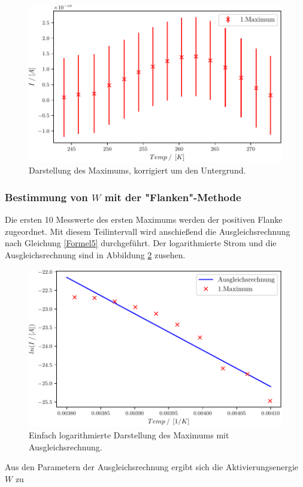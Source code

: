 \begin{figure}[H]
  \centering
  \includegraphics[width=.75\textwidth]{build/1_Temp_current_peak.pdf}
  \caption{Darstellung des Maximums, korrigiert um den Untergrund.}
  \label{fig:Auswertung_5_6}
\end{figure}


\subsubsection{Bestimmung von $W$ mit der "Flanken"-Methode}

Die ersten 10 Messwerte des ersten Maximums werden der positiven Flanke zugeordnet. Mit diesem Teilintervall wird anschießend die Ausgleichsrechnung nach Gleichung \eqref{Formel5} durchgeführt. Der logarithmierte Strom und die Ausgleichsrechnung sind in Abbildung \ref{fig:Auswertung_7_8} zusehen.

\begin{figure}[H]
  \centering
  \includegraphics[width=.75\textwidth]{build/1_Temp_current_peak_log_fit.pdf}
  \caption{Einfach logarithmierte Darstellung des Maximums mit Ausgleichsrechnung.}
  \label{fig:Auswertung_7_8}
\end{figure}

Aus den Parametern der Ausgleichsrechnung ergibt sich die Aktivierungsenergie $W$ zu

